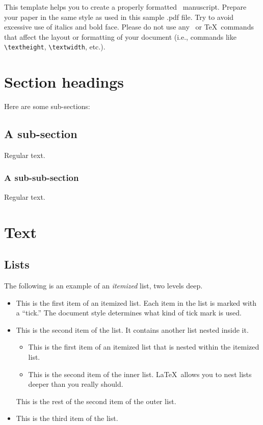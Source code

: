 \documentclass[bj,authoryear]{imsart}
\theoremstyle{plain}
\theoremstyle{definition}
\begin{document}
This template helps you to create a properly formatted \LaTeXe\ manuscript.
Prepare your paper in the same style as used in this sample .pdf file.
Try to avoid excessive use of italics and bold face.
Please do not use any \LaTeXe\ or \TeX\ commands that affect the layout
or formatting of your document (i.e., commands like \verb|\textheight|,
\verb|\textwidth|, etc.).

\section{Section headings}
Here are some sub-sections:
\subsection{A sub-section}
Regular text.
\subsubsection{A sub-sub-section}
Regular text.

\section{Text}
\subsection{Lists}

The following is an example of an \emph{itemized} list,
two levels deep.
\begin{itemize}
\item
This is the first item of an itemized list.  Each item
in the list is marked with a ``tick.''  The document
style determines what kind of tick mark is used.
\item
This is the second item of the list.  It contains another
list nested inside it.
\begin{itemize}
\item This is the first item of an itemized list that
is nested within the itemized list.
\item This is the second item of the inner list.  \LaTeX\
allows you to nest lists deeper than you really should.
\end{itemize}
This is the rest of the second item of the outer list.
\item
This is the third item of the list.
\end{itemize}
\end{document}

